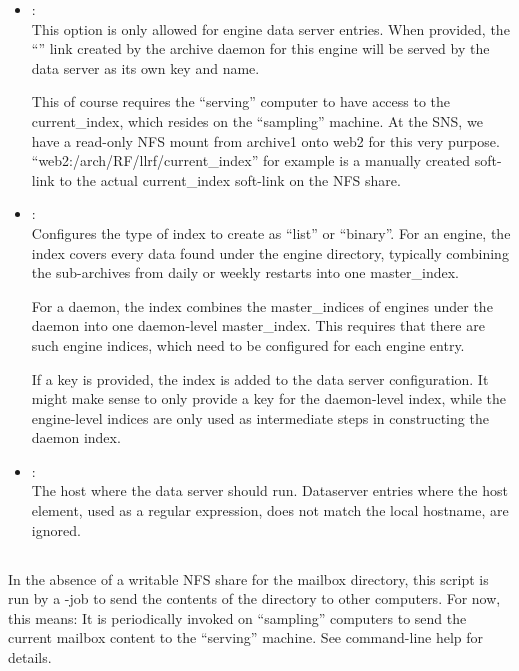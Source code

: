 \begin{itemize}
\item {}:\\
      This option is only allowed for engine data server entries.
      When provided, the ``'' link created by the
      archive daemon for this engine will be served by the
      data server as its own key and name.

      This of course requires the ``serving'' computer to have access
      to the current\_index, which resides on the ``sampling''
      machine. At the SNS, we have a read-only NFS mount from archive1
      onto web2 for this very purpose.
      ``web2:/arch/RF/llrf/current\_index'' for example is a manually
      created soft-link to the actual current\_index soft-link on the
      NFS share.
\item {}: \\
      Configures the type of index to create as ``list'' or ``binary''.
      For an engine, the index covers every data found under the engine
      directory, typically combining the sub-archives from daily or weekly
      restarts into one master\_index.

      For a daemon, the index combines the master\_indices of engines
      under the daemon into one daemon-level master\_index. This
      requires that there are such engine indices, which need to be
      configured for each engine entry.

      If a key is provided, the index is added to the data server
      configuration. It might make sense to only provide a key for the
      daemon-level index, while the engine-level indices are only used
      as intermediate steps in constructing the daemon index.            
\item {}: \\
      The host where the data server should run. Dataserver entries where
      the host element, used as a regular expression, does not match the
      local hostname, are ignored.
\end{itemize}

\subsection{}
In the absence of a writable NFS share for the mailbox directory,
this script is run by a -job to send the contents of the
 directory to other computers.
For now, this means: It is periodically invoked on ``sampling''
computers to send the current mailbox content to the ``serving''
machine. See command-line help for details.

